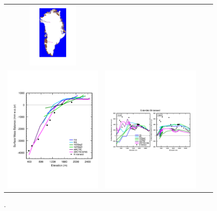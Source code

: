 \documentclass[draft]{agujournal2019}
\begin{document}
\begin{figure}[t]
\begin{center}
\begin{tabular}{cccc}
         \includegraphics[width=25mm]{figs/temp_icemask.pdf} \\
         \includegraphics[width=50mm]{figs/temp_zsmb_ktrans_obsperiod.pdf}&
         \includegraphics[width=50mm]{figs/temp_zsmb_btrans_obsperiod.pdf} \\
\end{tabular}
\end{center}
\caption{.}
\label{fig:trans}
\end{figure}
\end{document}
